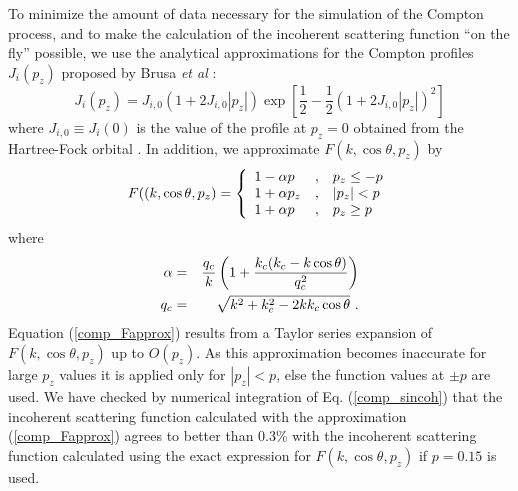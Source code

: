 To minimize the amount of data necessary for 
the simulation of the Compton process, and to make 
the calculation of the incoherent scattering function ``on the fly'' 
possible, we use 
the analytical approximations for the Compton profiles 
$J_i(p_z)$ proposed by Brusa {\em et al} \cite{BS96}:
\begin{equation}
\label{comp_Japprox}
J_i(p_z) = J_{i,0} (1 + 2 J_{i,0} |p_z| ) \exp\left[\frac{1}{2} - 
\frac{1}{2}\left(1 + 2 J_{i,0} |p_z| \right)^2\right]
\end{equation}
where $J_{i,0} \equiv J_i(0)$ is the value of the profile at 
$p_z = 0$ obtained from the Hartree-Fock orbital \cite{BM75}. 
In addition, we approximate $F(k,\cos \theta, p_z)$ by
\begin{equation}
\label{comp_Fapprox}
F((k,\cos \theta, p_z) = \left\{
\begin{array}{l@{\quad , \quad}l}
1 - \alpha p & p_z \le -p \\
1 + \alpha p_z & |p_z| < p \\
1 + \alpha p & p_z \ge p 
\end{array} \right.
\end{equation}
where 
\begin{eqnarray}
\label{comp_alpha}
\alpha & = & \frac{q_c}{k} \left(1 + 
{k_c (k_c - k \cos \theta) \over q_c^2} \right)
\nonumber \\
q_c & = & \sqrt{k^2 + k_c^2 - 2 k k_c \cos \theta}~.
\end{eqnarray}
Equation (\ref{comp_Fapprox}) results from a Taylor series 
expansion of $F(k,\cos \theta, p_z)$ up to $O(p_z)$. As this 
approximation becomes inaccurate for large $p_z$ values 
it is applied only for $|p_z| < p$, else the function values at 
$\pm p$ are used. We have checked by numerical integration 
of Eq. (\ref{comp_sincoh}) that the incoherent scattering function 
calculated with the approximation (\ref{comp_Fapprox}) agrees 
to better than 0.3\% with the incoherent scattering function 
calculated using the exact expression for $F(k,\cos \theta, p_z)$ 
if $p = 0.15$ is used. 

